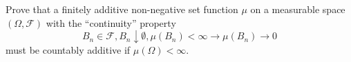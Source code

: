 Prove that a finitely additive non-negative set function \(\mu\) on a measurable space 
\((\Omega, \mathcal{F})\) with the ``continuity'' property
\[B_n \in \mathcal{F}, B_n \downarrow \emptyset, \mu(B_n) < \infty \to \mu(B_n) \to 0\]
must be countably additive if \(\mu(\Omega) < \infty\).
